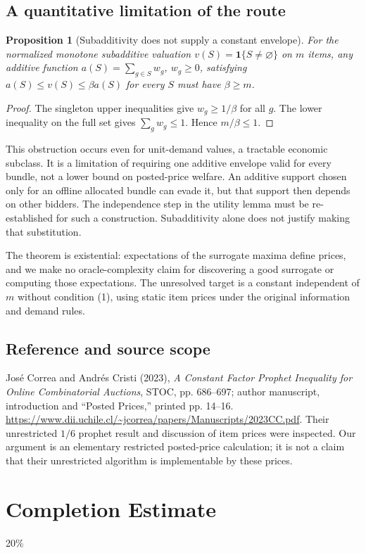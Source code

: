 \documentclass[11pt,a4paper]{article}
\newtheorem{proposition}[theorem]{Proposition}
\newcommand{\ind}{\mathbf 1}
\begin{document}
\subsection*{A quantitative limitation of the route}
\begin{proposition}[Subadditivity does not supply a constant envelope]
For the normalized monotone subadditive valuation $v(S)=\ind\{S\ne\varnothing\}$ on $m$ items, any additive function $a(S)=\sum_{g\in S}w_g$, $w_g\geq0$, satisfying $a(S)\leq v(S)\leq\beta a(S)$ for every $S$ must have $\beta\geq m$.
\end{proposition}
\begin{proof}
The singleton upper inequalities give $w_g\geq1/\beta$ for all $g$. The lower inequality on the full set gives $\sum_gw_g\leq1$. Hence $m/\beta\leq1$.
\end{proof}
This obstruction occurs even for unit-demand values, a tractable economic subclass. It is a limitation of requiring one additive envelope valid for every bundle, not a lower bound on posted-price welfare. An additive support chosen only for an offline allocated bundle can evade it, but that support then depends on other bidders. The independence step in the utility lemma must be re-established for such a construction. Subadditivity alone does not justify making that substitution.

The theorem is existential: expectations of the surrogate maxima define prices, and we make no oracle-complexity claim for discovering a good surrogate or computing those expectations. The unresolved target is a constant independent of $m$ without condition (1), using static item prices under the original information and demand rules.

\subsection*{Reference and source scope}
Jos\'e Correa and Andr\'es Cristi (2023), \emph{A Constant Factor Prophet Inequality for Online Combinatorial Auctions}, STOC, pp. 686--697; author manuscript, introduction and ``Posted Prices,'' printed pp. 14--16. \url{https://www.dii.uchile.cl/~jcorrea/papers/Manuscripts/2023CC.pdf}. Their unrestricted $1/6$ prophet result and discussion of item prices were inspected. Our argument is an elementary restricted posted-price calculation; it is not a claim that their unrestricted algorithm is implementable by these prices.

\section{Completion Estimate}
20\%
\end{document}
